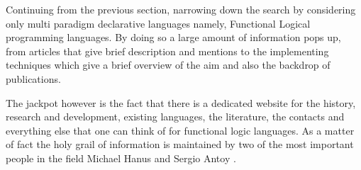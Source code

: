 \documentclass[thesis-solanki.tex]{subfiles}
\begin{document}
  Continuing from the previous section, narrowing down the search by considering only multi paradigm declarative
  languages namely, Functional Logical programming languages.
  By doing so a large amount of information pops up, from articles that give brief description and mentions
  \cite{website:wikiflpl, website:wikiflpllist} to the implementing techniques \cite{website:imlpementingflpl}
  which give a brief overview of the aim and also the backdrop of publications.

  The jackpot however is the fact that there is a dedicated website \cite{website:funclogprog} for the history,
  research and development, existing languages, the literature, the contacts and everything else that one can think
  of for functional logic languages.
  As a matter of fact the holy grail of information is maintained by two of the most important people in the field
  Michael Hanus \cite{website:mhanus} and Sergio Antoy \cite{website:santoy}.

\begin{comment}
\begin{enumerate}
\item FLPL Wikipedia,
\\* \url{http://en.wikipedia.org/wiki/Functional_logic_programming}
\\* \url{http://en.wikipedia.org/wiki/Category:Functional_logic_programming_languages}

\item Implementation of Functional Logic Languages
\\* \url{http://web.cecs.pdx.edu/~antoy/research/flp/}

\item Functional Logic Programming
\\* \url{http://www.informatik.uni-kiel.de/~mh/FLP/}
 
\end{enumerate}
\end{comment}


\begin{comment}
\section{People}
There are a lot of people working on this but, I found a lot of papers of two of them,
\begin{enumerate}
\item Michael Hanus,
\\* \url{http://www.informatik.uni-kiel.de/~mh/}
\item Sergio Antoy,
\\* \url{http://web.cecs.pdx.edu/~antoy/}
\item Uday S Reddy 
\\* \url{}
\end{enumerate}
\end{comment}
\end{document}
